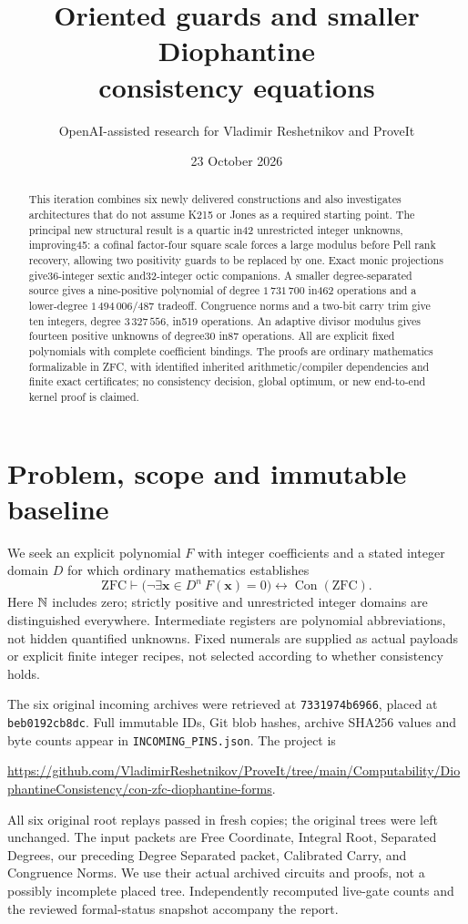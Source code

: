 \documentclass[11pt]{article}
\title{Oriented guards and smaller Diophantine\\consistency equations}
\author{OpenAI-assisted research for Vladimir Reshetnikov and ProveIt}
\date{23 October 2026}
\newcommand{\Con}{\operatorname{Con}}
\begin{document}
\maketitle
\begin{abstract}
This iteration combines six newly delivered constructions and also investigates
architectures that do not assume K215 or Jones as a required starting point.
The principal new structural result is a quartic in42 unrestricted integer
unknowns, improving45: a cofinal factor-four square scale forces a large
modulus before Pell rank recovery, allowing two positivity guards to be
replaced by one. Exact monic projections give36-integer sextic and32-integer
octic companions. A smaller degree-separated source gives a nine-positive
polynomial of degree $1\,731\,700$ in462 operations and a lower-degree
$1\,494\,006$/487 tradeoff. Congruence norms and a two-bit carry trim give
ten integers, degree $3\,327\,556$, in519 operations. An adaptive divisor
modulus gives fourteen positive unknowns of degree30 in87 operations.
All are explicit fixed polynomials with complete coefficient bindings.
The proofs are ordinary mathematics formalizable in ZFC, with identified
inherited arithmetic/compiler dependencies and finite exact certificates;
no consistency decision, global optimum, or new end-to-end kernel proof is
claimed.
\end{abstract}

\section{Problem, scope and immutable baseline}
We seek an explicit polynomial $F$ with integer coefficients and a stated
integer domain $D$ for which ordinary mathematics establishes
\[
 \mathrm{ZFC}\vdash
 \bigl(\neg\exists\mathbf x\in D^n\ F(\mathbf x)=0\bigr)
 \longleftrightarrow\Con(\mathrm{ZFC}).
\]
Here $\mathbb N$ includes zero; strictly positive and unrestricted integer domains
are distinguished everywhere. Intermediate registers are polynomial
abbreviations, not hidden quantified unknowns. Fixed numerals are supplied
as actual payloads or explicit finite integer recipes, not selected according
to whether consistency holds.

The six original incoming archives were retrieved at
\texttt{7331974b6966}, placed at \texttt{beb0192cb8dc}. Full immutable IDs,
Git blob hashes, archive SHA256 values and byte counts appear in
\texttt{INCOMING\_PINS.json}. The project is
\begin{center}\small
\url{https://github.com/VladimirReshetnikov/ProveIt/tree/main/Computability/DiophantineConsistency/con-zfc-diophantine-forms}.
\end{center}
All six original root replays passed in fresh copies; the original trees
were left unchanged. The input packets are Free Coordinate, Integral Root,
Separated Degrees, our preceding Degree Separated packet, Calibrated Carry,
and Congruence Norms. We use their actual archived circuits and proofs,
not a possibly incomplete placed tree. Independently recomputed live-gate
counts and the reviewed formal-status snapshot accompany the report.
\end{document}
